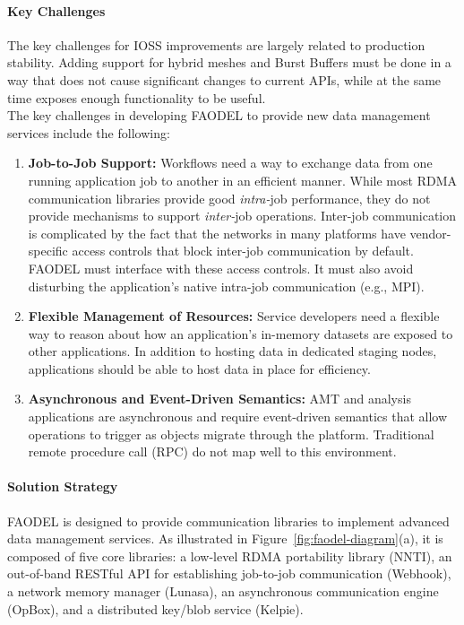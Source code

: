 \paragraph{Key  Challenges}
The key challenges for IOSS improvements are largely related to production stability. Adding support for hybrid meshes and Burst Buffers must be done in a way that does not cause significant changes to current APIs, while at the same time exposes enough functionality to be useful. \\

The key challenges in developing FAODEL to provide new data management services include the following:

\begin{enumerate}
  \item \textbf{Job-to-Job Support:} Workflows need a way to exchange data from one running application job to another in an efficient manner. While most RDMA communication libraries provide good \emph{intra-}job performance, they do not provide mechanisms to support \emph{inter-}job operations. Inter-job communication is complicated by the fact that the networks in many platforms have vendor-specific access controls that block inter-job communication by default. FAODEL must interface with these access controls. It must also avoid disturbing the application's native intra-job communication (e.g., MPI).
  \item \textbf{Flexible Management of Resources:} Service developers need a flexible way to reason about how an application's in-memory datasets are exposed to other applications. In addition to hosting data in dedicated staging nodes, applications should be able to host data in place for efficiency.
  \item \textbf{Asynchronous and Event-Driven Semantics:} AMT and analysis applications are asynchronous and require event-driven semantics that allow operations to trigger as objects migrate through the platform. Traditional remote procedure call (RPC) do not map well to this environment.
\end{enumerate}

\paragraph{Solution Strategy}
FAODEL is designed to provide communication libraries to implement advanced data management services. As illustrated in Figure~\ref{fig:faodel-diagram}(a), it is composed of five core libraries: a low-level RDMA portability library (NNTI), an out-of-band RESTful API for establishing job-to-job communication (Webhook), a network memory manager (Lunasa), an asynchronous communication engine (OpBox), and a distributed key/blob service (Kelpie). 

